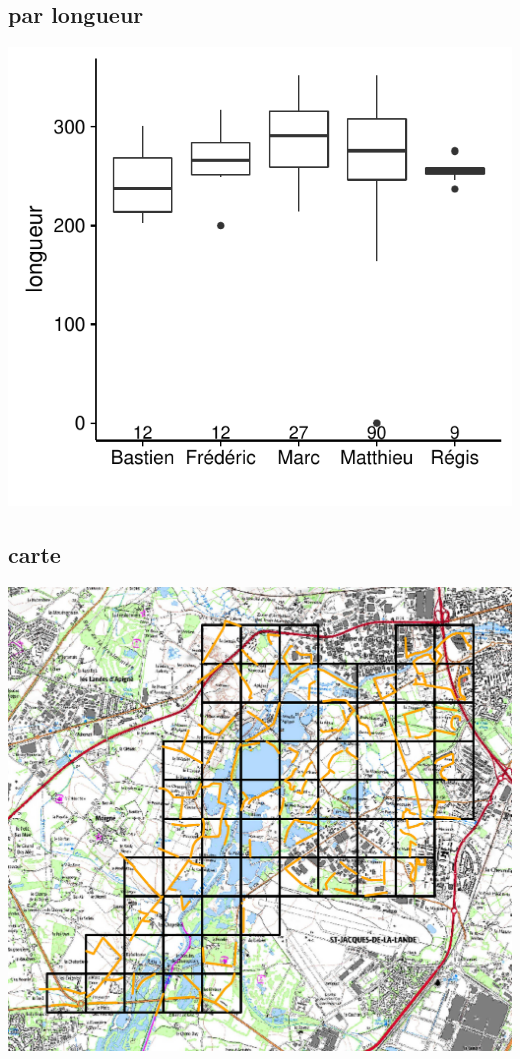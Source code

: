 \subsection{par longueur}
\includegraphics[width=\malargeurgraphique]{images/parcours_stat_email_longueur.pdf}
\subsection{carte}
\includegraphics[width=\malargeurgraphique]{images/parcours_carte.pdf}
\clearpage
